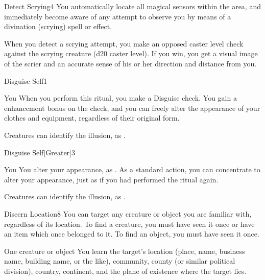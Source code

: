 \begin{spellsection}{Detect Scrying}{4}
\spelldur \durext
{}
\spellline
\spelleffect You automatically locate all magical sensors within the area, and immediately become aware of any attempt to observe you by means of a divination (scrying) spell or effect.

\par When you detect a scrying attempt, you make an opposed caster level check against the scrying creature (d20 \add caster level). If you win, you get a visual image of the scrier and an accurate sense of his or her direction and distance from you.
\end{spellsection}

\begin{spellsection}{Disguise Self}{1}
\spelldur \durlong \dismissable
\begin{spelltarget}{You}
    \spelleffect When you perform this ritual, you make a Disguise check. You gain a  enhancement bonus on the check, and you can freely alter the appearance of your clothes and equipment, regardless of their original form.
\end{spelltarget}
\spellnotes Creatures can identify the illusion, as .
\end{spellsection}

\begin{spellsection}{Disguise Self}[Greater]{3}
\spelldur \durext \dismissable
\begin{spelltarget}{You}
    \spelleffect You alter your appearance, as . As a standard action, you can concentrate to alter your appearance, just as if you had performed the  ritual again.
\end{spelltarget}
\spellnotes Creatures can identify the illusion, as .
\end{spellsection}

\begin{spellsection}{Discern Location}{8}
\spellspecial You can target any creature or object you are familiar with, regardless of its location. To find a creature, you must have seen it once or have an item which once belonged to it. To find an object, you must have seen it once.
\begin{spelltarget}{One creature or object}
    \spelleffect You learn the target's location (place, name, business name, building name, or the like), community, county (or similar political division), country, continent, and the plane of existence where the target lies.
\end{spelltarget}
\end{spellsection}

